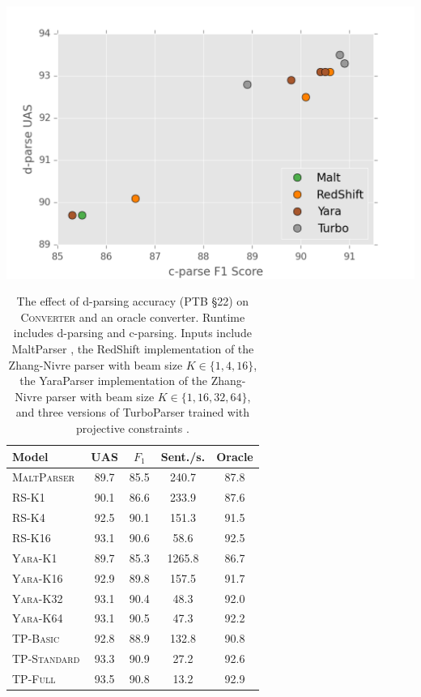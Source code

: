 \documentclass[11pt,letterpaper]{article}
\newcommand{\ParseName}{\textsc{Converter}\xspace}
\begin{document}
\begin{table}
  \centering
  \small
  \includegraphics[scale=0.5]{../notebooks/camera_ready_plot.png}
  \begin{tabular}[scale=0.8]{lcccc}
    \toprule
    Model & UAS  & $F_1$ & Sent./s.  & Oracle  \\
    \midrule
    \textsc{MaltParser}  & 89.7 & 85.5 & 240.7& 87.8 \\
    \textsc{RS-K1}       & 90.1 & 86.6 & 233.9& 87.6 \\
    \textsc{RS-K4}       & 92.5 & 90.1 & 151.3& 91.5 \\
    \textsc{RS-K16}      & 93.1 & 90.6 & 58.6 & 92.5 \\
    \textsc{Yara-K1}     & 89.7 & 85.3 & 1265.8 & 86.7 \\
    \textsc{Yara-K16}     & 92.9 & 89.8 & 157.5 & 91.7 \\
    \textsc{Yara-K32}     & 93.1 & 90.4 & 48.3 & 92.0 \\
    \textsc{Yara-K64}     & 93.1 & 90.5 & 47.3 & 92.2 \\
    \textsc{TP-Basic}    & 92.8 & 88.9 & 132.8& 90.8 \\
    \textsc{TP-Standard} & 93.3 & 90.9 & 27.2 & 92.6 \\
    \textsc{TP-Full}     & 93.5 & 90.8 & 13.2 & 92.9 \\
    \bottomrule
  \end{tabular}
  \caption{The effect of d-parsing accuracy (PTB \S 22)
    on \ParseName{} and an oracle converter.  Runtime includes
    d-parsing and c-parsing.  
    Inputs include 
 MaltParser \cite{nivre2006maltparser}, 
    the RedShift implementation of the Zhang-Nivre parser
    \cite{zhang2011transition} with beam size $K \in \{1, 4, 16\}$,
the YaraParser implementation of the Zhang-Nivre parser
    \cite{zhang2011transition} with beam size $K \in \{1, 16, 32, 64\}$, and three versions of TurboParser trained with projective constraints
    \cite{martins2013turning}.
\label{tab:oracle} }

\end{table}
\end{document}
